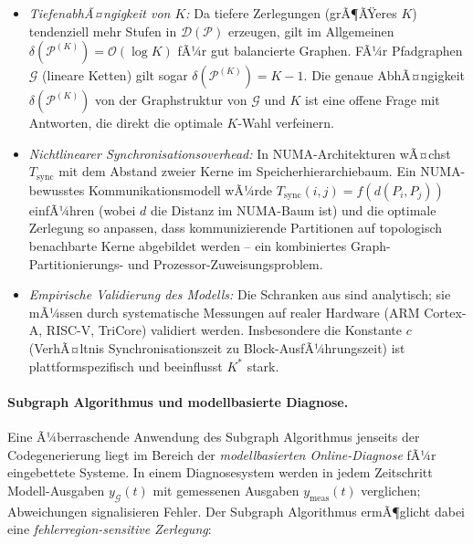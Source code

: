 ﻿\documentclass[12pt,a4paper]{article}
\theoremstyle{definition}
\begin{document}
\begin{itemize}[nosep]
  \item \emph{TiefenabhÃ¤ngigkeit von $K$:} Da tiefere Zerlegungen
        (grÃ¶ÃŸeres $K$) tendenziell mehr Stufen in $\mathcal{D}(\mathcal{P})$
        erzeugen, gilt im Allgemeinen
        $\delta(\mathcal{P}^{(K)}) = \mathcal{O}(\log K)$ fÃ¼r
        gut balancierte Graphen. FÃ¼r Pfadgraphen $\mathcal{G}$ (lineare
        Ketten) gilt sogar $\delta(\mathcal{P}^{(K)}) = K - 1$.
        Die genaue AbhÃ¤ngigkeit $\delta(\mathcal{P}^{(K)})$ von der
        Graphstruktur von $\mathcal{G}$ und $K$ ist eine offene Frage mit
        Antworten, die direkt die optimale $K$-Wahl verfeinern.

  \item \emph{Nichtlinearer Synchronisationsoverhead:} In NUMA-Architekturen
        wÃ¤chst $T_{\mathrm{sync}}$ mit dem Abstand zweier Kerne im
        Speicherhierarchiebaum. Ein NUMA-bewusstes Kommunikationsmodell
        wÃ¼rde $T_{\mathrm{sync}}(i,j) = f(d(P_i, P_j))$ einfÃ¼hren
        (wobei $d$ die Distanz im NUMA-Baum ist) und die optimale
        Zerlegung so anpassen, dass kommunizierende Partitionen auf
        topologisch benachbarte Kerne abgebildet werden -- ein
        kombiniertes Graph-Partitionierungs- und
        Prozessor-Zuweisungsproblem.

  \item \emph{Empirische Validierung des Modells:} Die
        Schranken aus  sind
        analytisch; sie mÃ¼ssen durch systematische Messungen auf
        realer Hardware (ARM Cortex-A, RISC-V, TriCore) validiert
        werden. Insbesondere die Konstante $c$ (VerhÃ¤ltnis
        Synchronisationszeit zu Block-AusfÃ¼hrungszeit) ist
        plattformspezifisch und beeinflusst $K^*$ stark.
\end{itemize}

\paragraph{Subgraph Algorithmus und modellbasierte Diagnose.}
Eine Ã¼berraschende Anwendung des Subgraph Algorithmus jenseits der
Codegenerierung liegt im Bereich der \emph{modellbasierten Online-Diagnose}
fÃ¼r eingebettete Systeme. In einem Diagnosesystem werden in jedem
Zeitschritt Modell-Ausgaben $y_{\mathcal{G}}(t)$ mit gemessenen
Ausgaben $y_{\mathrm{meas}}(t)$ verglichen; Abweichungen signalisieren
Fehler. Der Subgraph Algorithmus ermÃ¶glicht dabei eine
\emph{fehlerregion-sensitive Zerlegung}:
\end{document}
